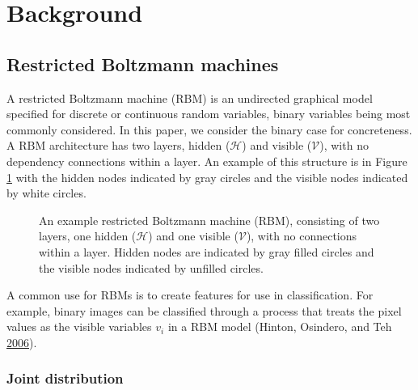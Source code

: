 \documentclass[]{article}
\theoremstyle{definition}
\begin{document}
\hypertarget{background}{%
\section{Background}\label{background}}

\hypertarget{restricted-boltzmann-machines}{%
\subsection{Restricted Boltzmann
machines}\label{restricted-boltzmann-machines}}

A restricted Boltzmann machine (RBM) is an undirected graphical model
specified for discrete or continuous random variables, binary variables
being most commonly considered. In this paper, we consider the binary
case for concreteness. A RBM architecture has two layers, hidden
(\(\mathcal{H}\)) and visible (\(\mathcal{V}\)), with no dependency
connections within a layer. An example of this structure is in Figure
\ref{fig:rbm} with the hidden nodes indicated by gray circles and the
visible nodes indicated by white circles.
\begin{figure}
  \centering
  \resizebox{\linewidth}{!}{}
  \caption{An example restricted Boltzmann machine (RBM), consisting of two layers, one hidden ($\mathcal{H}$) and one visible ($\mathcal{V}$), with no connections within a layer. Hidden nodes are indicated by gray filled circles and the visible nodes indicated by unfilled circles.}
  \label{fig:rbm}
\end{figure}
A common use for RBMs is to create features for use in classification.
For example, binary images can be classified through a process that
treats the pixel values as the visible variables \(v_i\) in a RBM model
(Hinton, Osindero, and Teh
\protect\hyperlink{ref-hinton2006fast}{2006}).

\hypertarget{joint-distribution}{%
\subsubsection{Joint distribution}\label{joint-distribution}}
\end{document}
